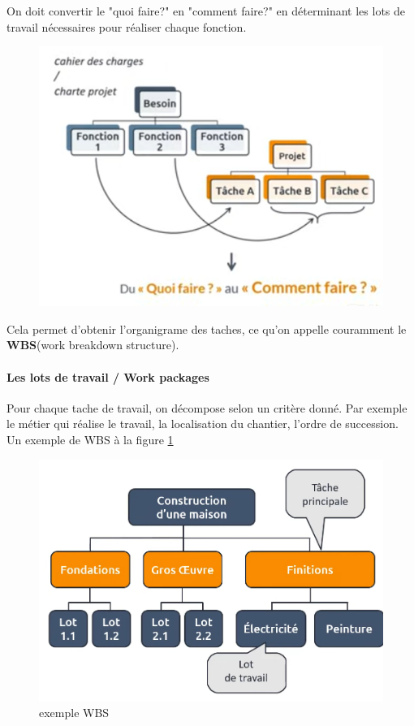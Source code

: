 On doit convertir le "quoi faire?" en "comment faire?" en déterminant les lots de travail nécessaires pour réaliser chaque fonction.
\begin{figure}[!h]
	\begin{center}
		\includegraphics[scale=0.2]{images/lots.png}
	\end{center}
\end{figure}
Cela permet d'obtenir l'organigrame des taches, ce qu'on appelle couramment le \textbf{WBS}(work breakdown structure).\\

\paragraph*{Les lots de travail / Work packages}
Pour chaque tache de travail, on décompose selon un critère donné. Par exemple le métier qui réalise le travail, la localisation du chantier, l'ordre de succession.
Un exemple de WBS à la figure \ref{fig:exemple_wbs}
\begin{figure}[!h]
	\begin{center}
		\includegraphics[scale=0.2]{images/exemple_wbs.png}
		\caption{exemple WBS}
		\label{fig:exemple_wbs}
	\end{center}
\end{figure}
